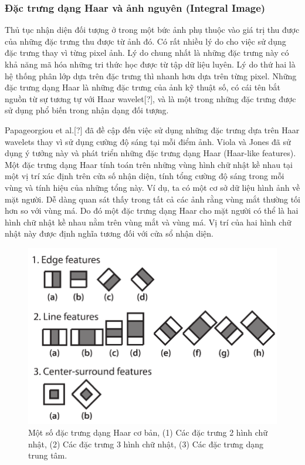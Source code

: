 \documentclass[14pt, oneside, a4paper, openany]{scrartcl}
\begin{document}
\subsubsection{Đặc trưng dạng Haar và ảnh nguyên (Integral Image)}
Thủ tục nhận diện đối tượng ở trong một bức ảnh phụ thuộc vào giá trị thu được của những đặc trưng thu được từ ảnh đó. Có rất nhiều lý do cho việc sử dụng đặc trưng thay vì từng pixel ảnh. Lý do chung nhất là những đặc trưng này có khả năng mã hóa những tri thức học được từ tập dữ liệu luyên. Lý do thứ hai là hệ thống phân lớp dựa trên đặc trưng thì nhanh hơn dựa trên từng pixel.
Những đặc trưng dạng Haar là những đặc trưng của ảnh kỹ thuật số, có cái tên bắt nguồn từ sự tương tự với Haar wavelet[?], và là một trong những đặc trưng được sử dụng phổ biến trong nhận dạng đối tượng.

Papageorgiou et al.[?] đã đề cập đến việc sử dụng những đặc trưng dựa trên Haar wavelets thay vì sử dụng cường độ sáng tại mỗi điểm ảnh. Viola và Jones đã sử dụng ý tưởng này và phát triển những đặc trưng dạng Haar (Haar-like features).
Một đặc trưng dạng Haar tính toán trên những vùng hình chữ nhật kề nhau tại một vị trí xác định trên cửa số nhận diện, tính tổng cường độ sáng trong mỗi vùng và tính hiệu của những tổng này.
Ví dụ, ta có một cơ sở dữ liệu hình ảnh về mặt người. Dễ dàng quan sát thấy trong tất cả các ảnh rằng vùng mắt thường tối hơn so với vùng má. Do đó một đặc trưng dạng Haar cho mặt người có thể là hai hình chữ nhật kề nhau nằm trên vùng mắt và vùng má. Vị trí của hai hình chữ nhật này được định nghĩa tương đối với cửa sổ nhận diện.

\begin{figure}
	\centering
	\includegraphics[scale=0.8]{figures/HaarFeatures.png} 
	\caption[Một số đặc trưng dạng Haar cơ bản]{Một số đặc trưng dạng Haar cơ bản, (1) Các đặc trưng 2 hình chữ nhật, 
		(2) Các đặc trưng 3 hình chữ nhật,
		(3) Các đặc trưng dạng trung tâm.}
\end{figure}
\end{document}
